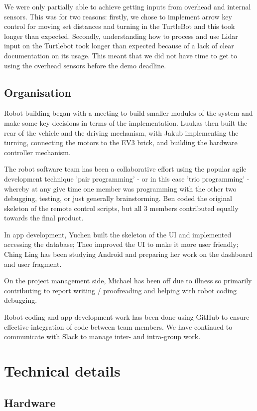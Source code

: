 \documentclass{article}
\begin{document}
We were only partially able to achieve getting inputs from overhead and internal sensors. This was for two reasons: firstly, we chose to implement arrow key control for moving set distances and turning in the TurtleBot and this took longer than expected. Secondly, understanding how to process and use Lidar input on the Turtlebot took longer than expected because of a lack of clear documentation on its usage. This meant that we did not have time to get to using the overhead sensors before the demo deadline.

\subsection{Organisation}

Robot building began with a meeting to build smaller modules of the system and make some key decisions in terms of the implementation. Luukas then built the rear of the vehicle and the driving mechanism, with Jakub implementing the turning, connecting the motors to the EV3 brick, and building the hardware controller mechanism.

The robot software team has been a collaborative effort using the popular agile development technique 'pair programming' - or in this case 'trio programming' - whereby at any give time one member was programming with the other two debugging, testing, or just generally brainstorming. Ben coded the original skeleton of the remote control scripts, but all 3 members contributed equally towards the final product.

In app development, Yuchen built the skeleton of the UI and implemented accessing the database; Theo improved the UI to make it more user friendly; Ching Ling has been studying Android and preparing her work on the dashboard and user fragment.

On the project management side, Michael has been off due to illness so primarily contributing to report writing / proofreading and helping with robot coding debugging. 

Robot coding and app development work has been done using GitHub to ensure effective integration of code between team members. We have continued to communicate with Slack to manage inter- and intra-group work.

\section{Technical details}


\subsection{Hardware}
\end{document}
